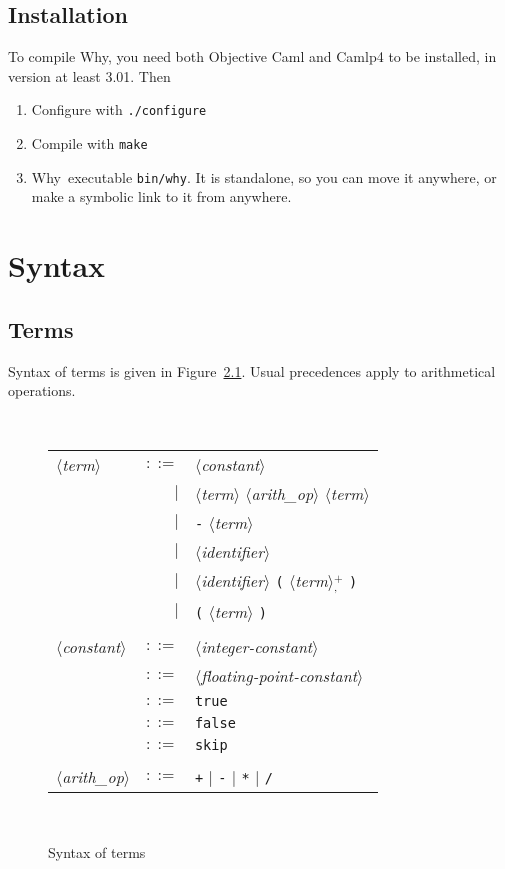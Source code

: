 \documentclass[a4paper,12pt]{report}
\newcommand{\why}{\textsf{Why}}
\newcommand{\te}[1]{\texttt{#1}}
\newcommand{\nt}[1]{$\langle$\textsl{#1}$\rangle$}
\newcommand{\plussep}[1]{$^+_#1$}
\begin{document}
\section{Installation}

To compile \why, you need both \textsf{Objective Caml} and
\textsf{Camlp4} to be installed, in version at least 3.01.
Then 

\begin{enumerate}
\item Configure with \texttt{./configure}
\item Compile with \texttt{make}
\item \why\ executable \texttt{bin/why}. It is standalone, 
  so you can move it anywhere, or make a symbolic link to it from anywhere.
\end{enumerate}


\chapter{Syntax}
\label{syntax}

\section{Terms}

Syntax of terms is given in Figure~\ref{fig:terms}.
Usual precedences apply to arithmetical operations.

\begin{figure}[htbp]
\begin{center}
\hrulefill\\
\begin{tabular}{lrl}
  \nt{term}
    & $::=$ & \nt{constant} \\
      & $|$ & \nt{term} \nt{arith\_op} \nt{term} \\
      & $|$ & \te{-} \nt{term} \\
      & $|$ & \nt{identifier} \\
      & $|$ & \nt{identifier} 
              \te{(} \nt{term}\plussep{\te{,}} \te{)} \\
      & $|$ & \te{(} \nt{term} \te{)} \\
  \\[0.1em]

  \nt{constant}
    & $::=$ & \nt{integer-constant} \\
    & $::=$ & \nt{floating-point-constant} \\
    & $::=$ & \te{true} \\
    & $::=$ & \te{false} \\
    & $::=$ & \te{skip} \\
  \\[0.1em]

  \nt{arith\_op}
    & $::=$ & \te{+} $|$ \te{-} $|$ \te{*} $|$ \te{/}
\end{tabular}\\
\hrulefill
\caption{Syntax of terms}
\label{fig:terms}
\end{center}            
\end{figure}
\end{document}

